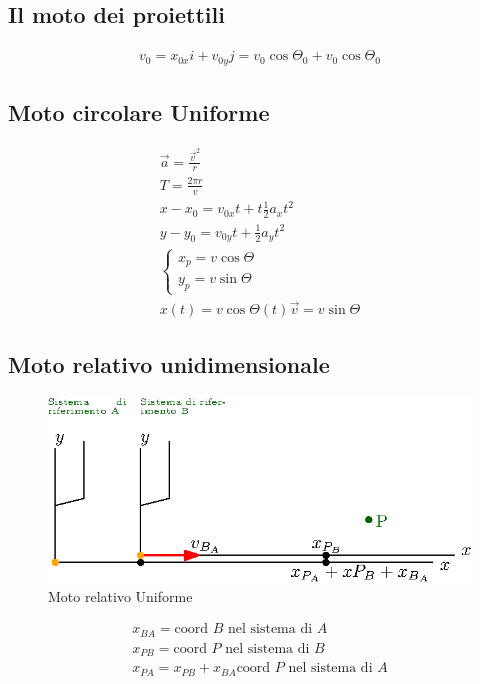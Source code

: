 \documentclass{article}
\begin{document}
\subsection{Il moto dei proiettili}
\label{sec:proiettili}

\begin{eqnarray}
  \label{eq:proiettili}
  v_0=x_{0x}i+v_{0y}j=v_0\cos\Theta_0 +v_0\cos\Theta_0
\end{eqnarray}

\subsection{Moto circolare Uniforme}
\label{sec:circUnifo}

\begin{eqnarray}
  \label{eq:motocircolareunifo}
  \vec{a}=\frac{\vec{v}^2}{r}\\
  T=\frac{2\pi r}{v}\\
  x-x_0=v_{0x}t+t\frac{1}{2}a_xt^2\\
  y-y_0=v_{0y}t+\frac{1}{2}a_yt^2\\
  \begin{cases}
    x_p=v\cos\Theta{}\\
    y_p=v\sin\Theta{}
  \end{cases}\\
  x(t)=v\cos\Theta{}(t)\vec{v}=v\sin\Theta{}
\end{eqnarray}

\subsection{Moto relativo unidimensionale}
\label{sec:motorelunid}
\begin{figure}[ht!]
  \centering
  \includegraphics{img/motorelun.eps}
  \caption{Moto relativo Uniforme}
  \label{fig:motorel}
\end{figure}
\begin{eqnarray}
  \label{eq:morelauni}
  x_{BA}=\text{coord }B\text{ nel sistema di } A\\
  x_{PB}=\text{coord }P\text{ nel sistema di } B\\
  x_{PA}=x_{PB}+x_{BA} \text{coord }P\text{ nel sistema di } A
\end{eqnarray}
\end{document}
